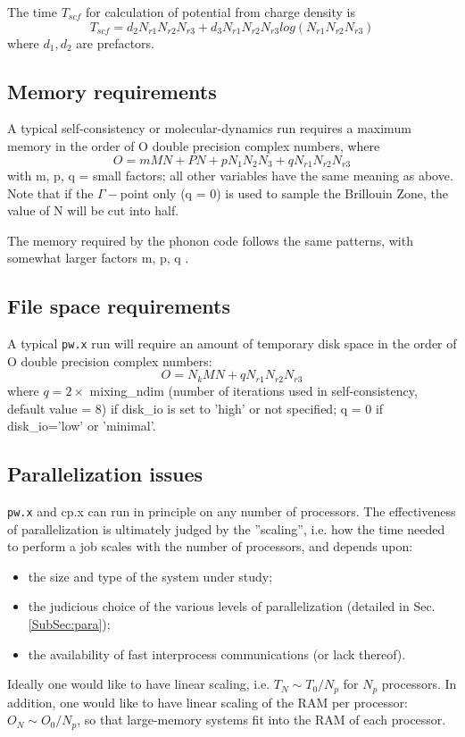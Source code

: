 \documentclass[12pt,a4paper]{article}
\def\pw.x{\texttt{pw.x}}
\begin{document}
The time $T_{scf}$ for calculation of potential from charge density is
$$T_{scf} = d_2 N_{r1} N_{r2} N_{r3} + d_3 N_{r1} N_{r2} N_{r3} 
            log(N_{r1} N_{r2} N_{r3} )$$
where $d_1, d_2$ are prefactors.

\subsection{Memory requirements}

A typical self-consistency or molecular-dynamics run requires a maximum
memory in the order of O double precision complex numbers, where
$$ O = m M N + P N + p N_1 N_2 N_3 + q N_{r1} N_{r2} N_{r3}$$
with m, p, q = small factors; all other variables have the same meaning as
above. Note that if the $\Gamma-$point only (q = 0) is used to sample the 
Brillouin Zone, the value of N will be cut into half.

The memory required by the phonon code follows the same patterns, with
somewhat larger factors m, p, q .

\subsection{File space requirements}

A typical \pw.x run will require an amount of temporary disk space in the
order of O double precision complex numbers:
$$O = N_k M N + q N_{r1} N_{r2}N_{r3}$$
where $q = 2\times$ mixing\_ndim (number of iterations used in 
self-consistency, default value = 8) if disk\_io is set to 'high' 
or not specified; q = 0 if disk\_io='low' or 'minimal'.

\subsection{Parallelization issues}
\label{SubSec:badpara}

\pw.x and cp.x can run in principle on any number of processors.
The effectiveness of parallelization is ultimately judged by the 
''scaling'', i.e. how the time needed to perform a job scales
 with the number of processors, and depends upon:
\begin{itemize}
\item the size and type of the system under study;
\item the judicious choice of the various levels of parallelization 
(detailed in Sec.\ref{SubSec:para});
\item the availability of fast interprocess communications (or lack thereof).
\end{itemize}
Ideally one would like to have linear scaling, i.e. $T_N \sim T_0/N_p$ for 
$N_p$ processors. In addition, one would like to have linear scaling of
the RAM per processor: $O_N \sim O_0/N_p$, so that large-memory systems
fit into the RAM of each processor.
\end{document}
